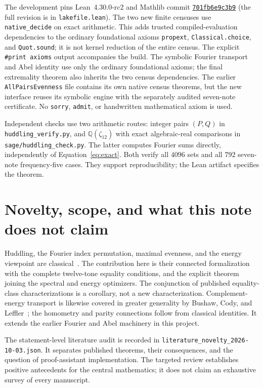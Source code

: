 \documentclass[11pt]{article}
\newcommand{\lean}[1]{\texttt{#1}}
\begin{document}
The development pins Lean~4.30.0-rc2 and Mathlib commit
\href{https://github.com/leanprover-community/mathlib4/tree/701fb6e9c3b9285968b375d19886bfc5ca134840}{\lean{701fb6e9c3b9}}
(the full revision is in \lean{lakefile.lean}).
The two new finite censuses use \lean{native\_decide} on exact arithmetic.
This adds trusted compiled-evaluation dependencies to the ordinary foundational axioms
\lean{propext}, \lean{Classical.choice}, and \lean{Quot.sound}; it is not kernel reduction
of the entire census. The explicit \lean{\#print axioms} output accompanies the build.
The symbolic Fourier transport and Abel identity use only the ordinary foundational
axioms; the final extremality theorem also inherits the two census dependencies.
The earlier \lean{AllPairsEvenness} file contains its own native census theorems,
but the new interface reuses its symbolic engine with the separately audited seven-note
certificate. No \lean{sorry}, \lean{admit}, or handwritten mathematical axiom is used.

Independent checks use two arithmetic routes: integer pairs $(P,Q)$ in
\lean{huddling\_verify.py}, and $\mathbb Q(\zeta_{12})$ with exact algebraic-real comparisons
in \lean{sage/huddling\_check.py}. The latter computes Fourier sums directly, independently
of Equation~\eqref{eq:exact}. Both verify all $4096$ sets and all $792$ seven-note
frequency-five cases. They support reproducibility; the Lean artifact specifies the theorem.

\section{Novelty, scope, and what this note does not claim}\label{sec:novelty}

Huddling, the Fourier index permutation, maximal evenness, and the energy viewpoint are
classical~\cite{Amiot2007,Amiot2009,CloughDouthett,DK}. The contribution here is their
connected formalization with the complete twelve-tone equality conditions, and the
explicit theorem joining the spectral and energy optimizers. The conjunction of
published equality-class characterizations is a corollary, not a new characterization.
Complement-energy transport is likewise covered in greater generality by Bushaw,
Cody, and Leffler~\cite[Theorems~2.16 and~3.5]{BCL}; the homometry and parity
connections follow from classical identities. It extends the earlier Fourier and
Abel machinery in this project.

The statement-level literature audit is recorded in
\lean{literature\_novelty\_2026-10-03.json}. It separates published theorems,
their consequences, and the question of proof-assistant implementation. The targeted
review establishes positive antecedents for the central mathematics; it does not
claim an exhaustive survey of every manuscript.
\end{document}

